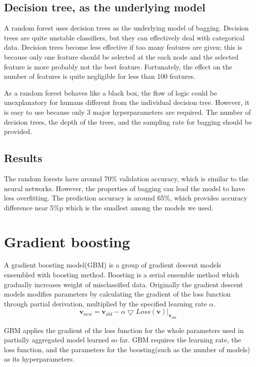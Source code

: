 \documentclass{article}
\begin{document}
\subsection{Decision tree, as the underlying model}
A random forest uses decision trees as the underlying model of bagging.
Decision trees are quite unstable classifiers, but they can effectively deal
with categorical data. Decision trees become less effective if too many features
are given; this is because only one feature should be selected at the each node
and the selected feature is more probably not the best feature. Fortunately, the
effect on the number of features is quite negligible for less than 100 features.

As a random forest behaves like a black box, the flow of logic could be
unexplanatory for humans different from the individual decision tree. However,
it is easy to use because only 3 major hyperparameters are required. The number
of decision trees, the depth of the trees, and the sampling rate for bagging should be provided.

\subsection{Results}
The random forests have around 70\% validation accuracy, which is similar to
the neural networks. However, the properties of bagging can lead the model to
have less overfitting. The prediction accuracy is around 65\%, which provides
accuracy difference near 5\%p which is the smallest among the models we used.

\section{Gradient boosting}
A gradient boosting model(GBM) is a group of gradient descent models ensembled
with boosting method. Boosting is a serial ensemble method which gradually
increases weight of misclassified data. Originally the gradient descent models
modifies parameters by calculating the gradient of the loss function through
partial derivation, multiplied by the specified learning rate $\alpha$.
\begin{equation*}
\mathbf{v}_{new} = \mathbf{v}_{old} - \alpha \bigtriangledown Loss \left( \mathbf{v}
\right)
\vert_{\mathbf{v}_{old}}
\end{equation*}

GBM applies the gradient of the loss function for the whole parameters
used in partially aggregated model learned so far. GBM requires the learning
rate, the loss function, and the parameters for the boosting(such as the number
of models) as its hyperparameters.
\end{document}
